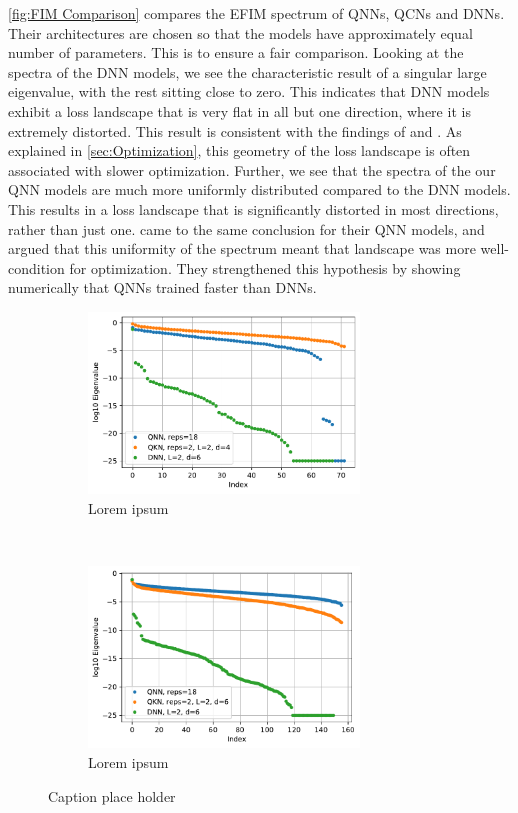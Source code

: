 \autoref{fig:FIM Comparison} compares the EFIM spectrum of QNNs, QCNs and DNNs. Their architectures are chosen so that the models have approximately equal number of parameters. This is to ensure a fair comparison. Looking at the spectra of the DNN models, we see the characteristic result of a singular large eigenvalue, with the rest sitting close to zero. This indicates that DNN models exhibit a loss landscape that is very flat in all but one direction, where it is extremely distorted. This result is consistent with the findings of \citet{abbas2020power} and \citet{karakida2019universal}. As explained in \autoref{sec:Optimization}, this geometry of the loss landscape is often associated with slower optimization. Further, we see that the spectra of the our QNN models are much more uniformly distributed compared to the DNN models. This results in a loss landscape that is significantly distorted in most directions, rather than just one. \citet{abbas2020power} came to the same conclusion for their QNN models, and argued that this uniformity of the spectrum meant that landscape was more well-condition for optimization. They strengthened this hypothesis by showing numerically that QNNs trained faster than DNNs. 

\begin{figure}[H]
    \centering
    \begin{subfigure}[t]{0.5\textwidth}
        \centering
        \includegraphics[height=1.9in]{latex/figures/FIM_qubits_4.pdf}
        \caption{Lorem ipsum}
        
    \end{subfigure}%
    ~ 
    \begin{subfigure}[t]{0.5\textwidth}
        \centering
        \includegraphics[height=1.9in]{latex/figures/FIM_qubits_6.pdf}
        \caption{Lorem ipsum}
    \end{subfigure}
    \caption{Caption place holder}
    \label{fig:FIM Comparison}
\end{figure}


